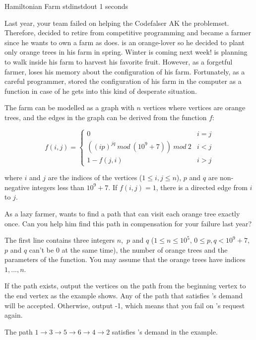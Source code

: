 \begin{problem}{Hamiltonian Farm}
{stdin}{stdout}
{1 seconds}{}{}

Last year, your team failed on helping the Codefalser \Suzukaze  AK the problemset. Therefore, \Suzukaze decided to retire from competitive programming and became a farmer since he wants to own a farm as \pittoresque does. \Suzukaze is an orange-lover so he decided to plant only orange trees in his farm in spring. Winter is coming next week! \Suzukaze is planning to walk inside his farm to harvest his favorite fruit. However, as a forgetful farmer, \Suzukaze loses his memory about the configuration of his farm. Fortunately, as a careful programmer, \Suzukaze stored the configuration of his farm in the computer as a function in case of he gets into this kind of desperate situation.
\par
The farm can be modelled as a graph with $n$ vertices where vertices are orange trees, and the edges in the graph can be derived from the function $f$:

$$f(i,j)=
\begin{cases}
0& \text{$i=j$}\\
((ip)^{jq}\ mod\ (10^{9}+7))\ mod\ 2& \text{$i<j$}\\
1-f(j,i)& \text{$i>j$}
\end{cases}$$

where $i$ and $j$ are the indices of the vertices ($1\leq i,j\leq n$), $p$ and $q$ are non-negative integers less than $10^{9}+7$. If $f(i,j)=1$, there is a directed edge from $i$ to $j$.

\par
As a lazy farmer, \Suzukaze wants to find a path that can visit each orange tree exactly once. Can you help him find this path in compensation for your failure last year?

\InputFile

The first line contains three integers $n$,\ $p$ and $q$ ($1 \leq n \leq 10^{5}$, $0 \leq p,q < 10^{9}+7,$ $p$ and $q$ can't be 0 at the same time), the number of orange trees and the parameters of the function. You may assume that the orange trees have indices $1, ..., n$.

\OutputFile

If the path exists, output the vertices on the path from the beginning vertex to the end vertex as the example shows. Any of the path that satisfies \Suzukaze 's demand will be accepted. Otherwise, output -1, which means that you fail on \Suzukaze 's request again.

\Examples

\begin{example}
%
\end{example}

\Explanation
The path $1\xrightarrow{}3\xrightarrow{}5\xrightarrow{}6\xrightarrow{}4\xrightarrow{}2$ satisfies \Suzukaze's demand in the example.

\end{problem}
